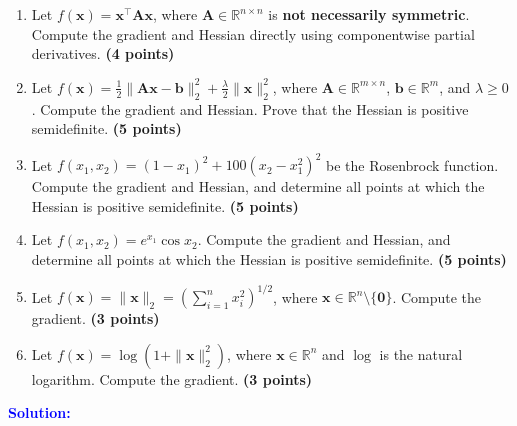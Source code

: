 \documentclass[10pt,a4paper]{article}
\newcommand{\solution}{\par\medskip
    \textcolor{blue}{\textbf{Solution:}}\par\smallskip}
\begin{document}
\begin{enumerate}
    \item
    Let $f(\mathbf{x})=\mathbf{x}^\top\mathbf{A}\mathbf{x}$,
    where $\mathbf{A}\in\mathbb{R}^{n\times n}$ is
    \textbf{not necessarily symmetric}.
    Compute the gradient and Hessian directly using
    componentwise partial derivatives.
    \textbf{(4 points)}

    \item
    Let $f(\mathbf{x})
    =\frac12\|\mathbf{A}\mathbf{x}-\mathbf{b}\|_2^2
    +\frac{\lambda}{2}\|\mathbf{x}\|_2^2$,
    where $\mathbf{A}\in\mathbb{R}^{m\times n}$,
    $\mathbf{b}\in\mathbb{R}^m$, and $\lambda\geq0$.
    Compute the gradient and Hessian. Prove that the Hessian
    is positive semidefinite.
    \textbf{(5 points)}

    \item
    Let $f(x_1,x_2)=(1-x_1)^2+100(x_2-x_1^2)^2$
    be the Rosenbrock function.
    Compute the gradient and Hessian, and determine all points
    at which the Hessian is positive semidefinite.
    \textbf{(5 points)}
    
    \item
    Let $f(x_1,x_2)=e^{x_1}\cos x_2$.
    Compute the gradient and Hessian, and determine all points
    at which the Hessian is positive semidefinite.
    \textbf{(5 points)}

    \item
    Let $f(\mathbf{x})=\|\mathbf{x}\|_2
    =\left(\sum_{i=1}^n x_i^2\right)^{1/2}$,
    where $\mathbf{x}\in\mathbb{R}^n\setminus\{\mathbf{0}\}$.
    Compute the gradient.
    \textbf{(3 points)}

    \item
    Let $f(\mathbf{x})=\log(1+\|\mathbf{x}\|_2^2)$,
    where $\mathbf{x}\in\mathbb{R}^n$ and $\log$ is the
    natural logarithm.
    Compute the gradient.
    \textbf{(3 points)}
    
\end{enumerate}


\solution
\end{document}
